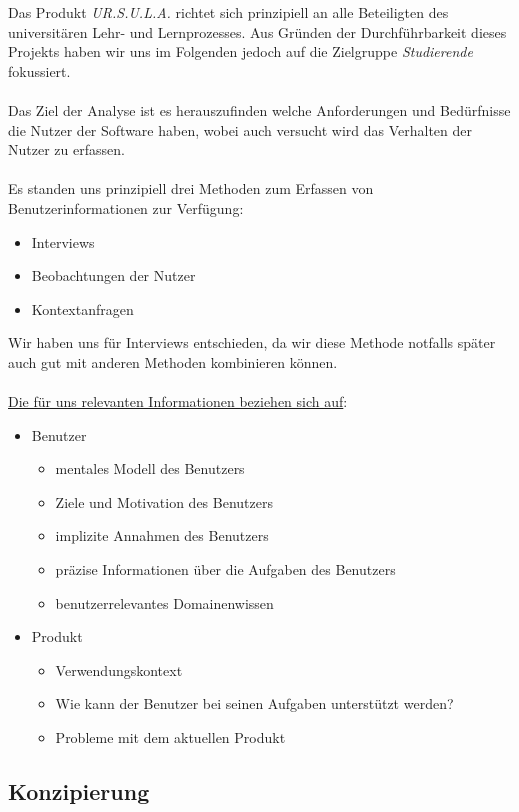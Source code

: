 \documentclass{article}
\begin{document}
Das Produkt \textit{UR.S.U.L.A.} richtet sich prinzipiell an alle Beteiligten des universitären Lehr- und Lernprozesses. Aus Gründen der Durchführbarkeit dieses Projekts haben wir uns im Folgenden jedoch auf die Zielgruppe \textit{Studierende} fokussiert.\\
\\
Das Ziel der Analyse ist es herauszufinden welche Anforderungen und Bedürfnisse die Nutzer der Software haben, wobei auch versucht wird das Verhalten der Nutzer zu erfassen.\\
\\
Es standen uns prinzipiell drei Methoden zum Erfassen von Benutzerinformationen zur Verfügung:
\begin{itemize}
\item Interviews
\item Beobachtungen der Nutzer
\item Kontextanfragen
\end{itemize}
Wir haben uns für Interviews entschieden, da wir diese Methode notfalls später auch gut mit anderen Methoden kombinieren können.\\
\\
\underline{Die für uns relevanten Informationen beziehen sich auf}:
\begin{itemize}
\item Benutzer
	\begin{itemize}
	\item mentales Modell des Benutzers
	\item Ziele und Motivation des Benutzers
	\item implizite Annahmen des Benutzers
	\item präzise Informationen über die Aufgaben des Benutzers
	\item benutzerrelevantes Domainenwissen
	\end{itemize}
\item Produkt
	\begin{itemize}
	\item Verwendungskontext
	\item Wie kann der Benutzer bei seinen Aufgaben unterstützt werden?
	\item Probleme mit dem aktuellen Produkt
	\end{itemize}
\end{itemize}

\newpage

\subsection{Konzipierung}
\end{document}
